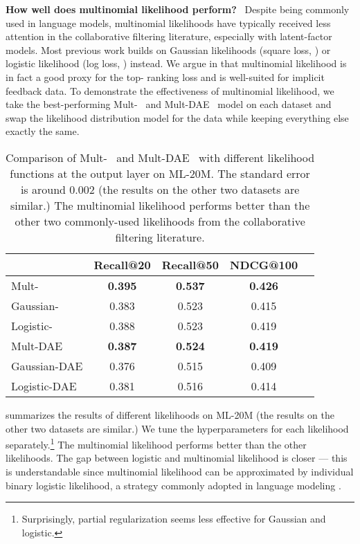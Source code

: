 \documentclass[sigconf]{acmart}
\DeclareRobustCommand{\parhead}[1]{\textbf{#1}~}
\newcommand{\mvae}{{\small Mult-}}
\newcommand{\mdae}{{\small Mult-}\gls{DAE}}
\newcommand{\vae}[1]{{\small #1-}}
\newcommand{\dae}[1]{{\small #1-}\gls{DAE}}
\begin{document}
\parhead{How well does multinomial likelihood perform?} 
Despite being commonly used in language models, multinomial likelihoods have typically received less attention in the collaborative filtering literature, 
especially with latent-factor models. Most previous work builds on Gaussian likelihoods (square loss, ) \citep{hu2008collaborative,ning2011slim,wu2016collaborative} or logistic likelihood (log loss, ) \citep{wu2016collaborative,he2017neural} instead. 
We argue in  that multinomial likelihood is in fact a good proxy for the top- ranking loss and is well-suited for implicit feedback data. 
To demonstrate the effectiveness of multinomial likelihood, we take the best-performing \mvae~ and \mdae~ model on each dataset and swap the likelihood distribution model for the data while keeping everything else exactly the same. 

\begin{table}
\centering
\caption{Comparison of \mvae~ and \mdae~ with different likelihood functions at the output layer on ML-20M. The standard error is around 0.002 (the results on the other two datasets are similar.) The multinomial likelihood performs better than the other two commonly-used likelihoods from the collaborative filtering literature. }
\begin{tabular}{ l c c c c }
  & Recall@20 & Recall@50 & NDCG@100  \\
  \toprule
  \vae{Mult} & \bf 0.395 & \bf 0.537 & \bf 0.426 \\
  \vae{Gaussian}  & 0.383 & 0.523 & 0.415 \\
  \vae{Logistic}  & 0.388 & 0.523 & 0.419 \\
  \midrule
  \dae{Mult} & \bf 0.387 & \bf 0.524 & \bf 0.419 \\
  \dae{Gaussian} & 0.376 & 0.515 & 0.409 \\
  \dae{Logistic} & 0.381 & 0.516 & 0.414 \\
  \bottomrule
\end{tabular}
\label{tab:multi_vs_others}
\end{table}

 summarizes the results of different likelihoods on ML-20M (the results on the other two datasets are similar.) We tune the hyperparameters for each likelihood separately.\footnote{Surprisingly, partial regularization seems less effective for Gaussian and logistic.} The multinomial likelihood performs better than the other likelihoods. The gap between logistic and multinomial likelihood is closer --- this is understandable since multinomial likelihood can be approximated by individual binary logistic likelihood, a strategy commonly adopted in language modeling \citep{mikolov2013distributed,xu2011efficient}.
\end{document}
